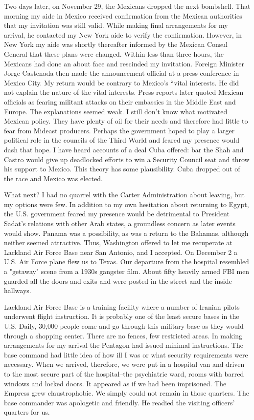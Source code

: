 Two days later, on November 29, the Mexicans dropped the next bombshell. That morning my aide in Mexico received confirmation from the Mexican authorities that my invitation was still valid. While making final arrangements for my arrival, he contacted my New York aide to verify the confirmation. However, in New York my aide was shortly thereafter informed by the Mexican Consul General that these plans were changed. Within less than three hours, the Mexicans had done an about face and rescinded my invitation. Foreign Minister Jorge Castenada then made the announcement official at a press conference in Mexico City. My return would be contrary to Mexico's “vital interests. He did not explain the nature of the vital interests. Press reports later quoted Mexican officials as fearing militant attacks on their embassies in the Middle East and Europe. The explanations seemed weak. I still don’t know what motivated Mexican policy. They have plenty of oil for their needs and therefore had little to fear from Mideast producers. Perhaps the government hoped to play a larger political role in the councils of the Third World and feared my presence would dash that hope. I have heard accounts of a deal Cuba offered: bar the Shah and Castro would give up deadlocked efforts to win a Security Council seat and throw his support to Mexico. This theory has some plausibility. Cuba dropped out of the race and Mexico was elected. 

What next? I had no quarrel with the Carter Administration about leaving, but my options were few. In addition to my own hesitation about returning to Egypt, the U.S. government feared my presence would be detrimental to President Sadat’s relations with other Arab states, a groundless concern as later events would show. Panama was a possibility, as was a return to the Bahamas, although neither seemed attractive. Thus, Washington offered to let me recuperate at Lackland Air Force Base near San Antonio, and I accepted. On December 2 a U.S. Air Force plane flew us to Texas. Our departure from the hospital resembled a "getaway" scene from a 1930s gangster film. About fifty heavily armed FBI men guarded all the doors and exits and were posted in the street and the inside hallways. 

Lackland Air Force Base is a training facility where a number of Iranian pilots underwent flight instruction. It is probably one of the least secure bases in the U.S. Daily, 30,000 people come and go through this military base as they would through a shopping center. There are no fences, few restricted areas. In making arrangements for my arrival the Pentagon had issued minimal instructions. The base command had little idea of how ill I was or what security requirements were necessary. When we arrived, therefore, we were put in a hospital van and driven to the most secure part of the hospital--the psychiatric ward, rooms with barred windows and locked doors. It appeared as if we had been imprisoned. The Empress grew claustrophobic. We simply could not remain in those quarters. The base commander was apologetic and friendly. He readied the visiting officers’ quarters for us. 

